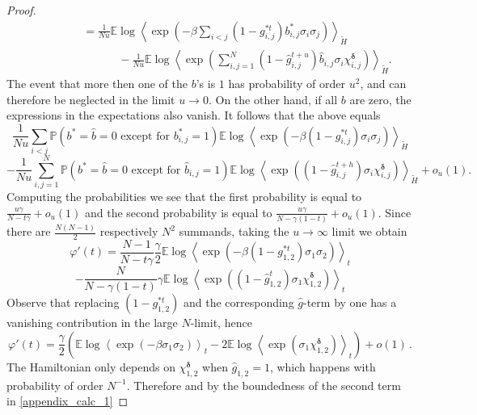 \documentclass[a4paper,12pt,oneside,reqno]{amsart}
\numberwithin{equation}{section}
\begin{document}
\begin{proof}
\[\begin{aligned}
& \qquad \qquad =\frac{1}{N u}{{\mathbb{E}}} \log\left<\exp\left(-\beta \sum\limits_{i<j} \left(1-g^{*t}_{i,j}\right)b^*_{i,j} \sigma_i \sigma_j\right)\right>_{\tilde{H}} \\
& \hspace{3cm} -\frac{1}{N u}{{\mathbb{E}}} \log \left<\exp\left( \sum\limits_{i,j=1}^N \left(1-\hat{g}^{t+u}_{i,j}\right)\hat{b}_{i,j}\sigma_i \chi^{\boldsymbol{\delta}}_{i,j}\right)\right>_{\tilde{H}}. 
\end{aligned} \]
The event that more then one of the $b$'s is $1$ has probability of order $u^2$, and can therefore be neglected
in the limit $u\to 0$. On the other hand, if all $b$ are zero, the expressions in the expectations also vanish. It follows that the above equals
$$ \frac{1}{N u}\sum\limits_{i<j} {\mathbb{P}}\left(b^*=\hat{b}=0 \mbox{ except for } b^*_{i,j}=1\right){{\mathbb{E}}} \log \left<\exp\left( -\beta \left(1-g^{*t}_{i,j}\right) \sigma_i \sigma_j\right)\right>_{\tilde{H}}$$
$$ - \frac{1}{N u}\sum\limits_{i,j=1}^N {\mathbb{P}}\left(b^*=\hat{b}=0 \mbox{ except for } \hat{b}_{i,j}=1\right){{\mathbb{E}}} \log \left<\exp\left(  \left(1-\hat{g}^{t+h}_{i,j}\right)\sigma_i \chi^{\boldsymbol{\delta}}_{i,j}\right)\right>_{\tilde{H}}+o_u(1). $$
Computing the probabilities we see that the first probability is equal to $\frac{u\gamma}{N-t\gamma}+o_u(1)$ and the second probability is equal to $\frac{u \gamma}{N-\gamma\left(1-t\right)}+o_u(1)$. Since there are $\frac{N(N-1)}{2}$ respectively $N^2$ summands,  taking the $u\rightarrow \infty$ limit we obtain 
$$ \varphi'(t) = \frac{N-1}{N-t\gamma} \frac{\gamma}{2}{{\mathbb{E}}} \log \left<\exp\left( -\beta \left(1-g^{*t}_{1,2}\right) \sigma_1 \sigma_2\right)\right>_t$$
$$ - \frac{N}{N-\gamma\left(1-t\right)}\gamma{{\mathbb{E}}} \log \left<\exp\left(\left(1-\hat{g}^{t}_{1,2}\right)\sigma_1 \chi^{\boldsymbol{\delta}}_{1,2}\right)\right>_t$$
Observe that replacing  $\left(1-g^{*t}_{1,2}\right)$ and the corresponding $\hat{g}$-term by one has a vanishing contribution in the large $N$-limit, hence 
\begin{equation}\label{appendix_calc_1}
\varphi'(t) = \frac{\gamma}{2}\left({{\mathbb{E}}} \log \left<\exp\left( -\beta \sigma_1 \sigma_2\right)\right>_t -2{{\mathbb{E}}} \log \left<\exp\left( \sigma_1 \chi^{\boldsymbol{\delta}}_{1,2}\right)\right>_t\right)+o(1)\,.
\end{equation}
The Hamiltonian only depends on $\chi^{\boldsymbol{\delta}}_{1,2}$ when $\hat{g}_{1,2}=1$, which happens with probability of order $N^{-1}$. Therefore and by the boundedness of the second term in \eqref{appendix_calc_1}

\end{proof}
\end{document}

